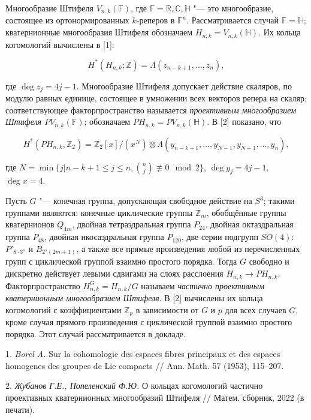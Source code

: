
\vzmscaption

Многообразие Штифеля $V_{n,k}(\mathbb{F})$, где $\mathbb{F} = \mathbb{R}, \mathbb{C}, \mathbb{H}$ "--- это многообразие, состоящее из ортонормированных $k$-реперов в $\mathbb{F}^n$. Рассматривается случай $\mathbb{F} = \mathbb{H}$; кватернионные многообразия Штифеля обозначаем $H_{n,k} = V_{n,k}(\mathbb{H})$. Их кольца когомологий вычислены в [1]:

$$H^*(H_{n,k}; \mathbb{Z}) = \Lambda(z_{n-k+1}, \ldots, z_n),$$

где $\deg z_j = 4j - 1$. Многообразие Штифеля допускает действие скаляров, по модулю равных единице, состоящее в умножении всех векторов репера на скаляр; соответствующее факторпространство называется \emph{проективным многообразием Штифеля $PV_{n,k}(\mathbb{F})$}; обозначаем $PH_{n,k}=PV_{n,k}(\mathbb{H})$. В [2] показано, что

$$H^*(PH_{n,k}, \mathbb{Z}_2) = \mathbb{Z}_2[x]/(x^N) \otimes \Lambda(y_{n-k+1}, \ldots, y_{N-1}, y_{N+1}, \ldots, y_n),$$

где $N = \min \{j | n - k + 1 \leqslant j \leqslant n, \binom{n}{j} \not\equiv 0 \mod 2\}$, $\deg y_j = 4j - 1$, $\deg x = 4$.

Пусть $G$ "--- конечная группа, допускающая свободное действие на $S^3$; такими группами являются: конечные циклические группы $\mathbb{Z}_m$, обобщённые группы кватернионов $Q_{4m}$, двойная тетраэдральная группа $P_{24}$, двойная октаэдральная группа $P_{48}$, двойная икосаэдральная группа $P_{120}$, две серии подгрупп $SO(4)$: $P'_{8\cdot3^s}$ и $B_{2^s(2m+1)}$, а также все прямые произведения любой из перечисленных групп с циклической группой взаимно простого порядка. Тогда $G$ свободно и дискретно действует левыми сдвигами на слоях расслоения $H_{n,k} \to PH_{n,k}$. Факторпространство $H^G_{n,k} = H_{n,k}/G$ называем \emph{частично проективным кватернионным многообразием Штифеля}. В [2] вычислены их кольца когомологий с коэффициентами $\mathbb{Z}_p$ в зависимости от $G$ и $p$ для всех случаев $G$, кроме случая прямого произведения с циклической группой взаимно простого порядка. Этот случай рассматривается в докладе.


\litlist

1. \emph{Borel A.} Sur la cohomologie des espaces fibres principaux et des espaces homogenes
des groupes de Lie compacts // Ann. Math. 57 (1953), 115–207.

2. \emph{Жубанов Г.Е., Попеленский Ф.Ю.} О кольцах когомологий частично проективных кватернионных многообразий Штифеля // Матем. сборник, 2022 (в печати).
